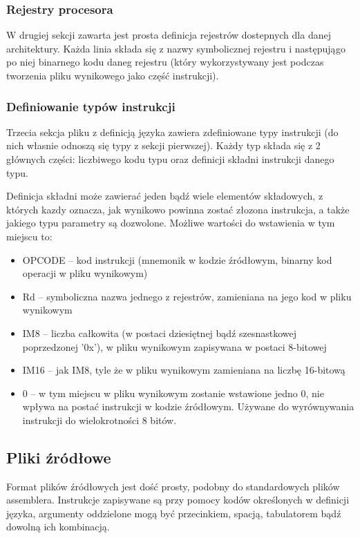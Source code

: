 \documentclass[a4paper,12pt]{report}
\begin{document}
\subsubsection{Rejestry procesora}

W drugiej sekcji zawarta jest prosta definicja rejestrów dostepnych dla danej architektury. Każda linia składa się z nazwy symbolicznej rejestru i następujągo po niej binarnego kodu daneg rejestru (który wykorzystywany jest podczas tworzenia pliku wynikowego jako część instrukcji).

\subsubsection{Definiowanie typów instrukcji}

Trzecia sekcja pliku z definicją języka zawiera zdefiniowane typy instrukcji (do nich własnie odnoszą się typy z sekcji pierwszej). Każdy typ składa się z 2 głównych części: liczbiwego kodu typu oraz definicji składni instrukcji danego typu.

Definicja składni może zawierać jeden bądź wiele elementów składowych, z których kazdy oznacza, jak wynikowo powinna zostać złozona instrukcja, a także jakiego typu parametry są dozwolone. Możliwe wartości do wstawienia w tym miejscu to:
\begin{itemize}
  \item OPCODE -- kod instrukcji (mnemonik w kodzie źródłowym, binarny kod operacji w pliku wynikowym)
  \item Rd -- symboliczna nazwa jednego z rejestrów, zamieniana na jego kod w pliku wynikowym
  \item IM8 -- liczba całkowita (w postaci dziesiętnej bądź szesnastkowej poprzedzonej '0x'), w pliku wynikowym zapisywana w postaci 8-bitowej
  \item IM16 -- jak IM8, tyle że w pliku wynikowym zamieniana na liczbę 16-bitową
  \item 0 -- w tym miejscu w pliku wynikowym zostanie wstawione jedno 0, nie wpływa na postać instrukcji w kodzie źródłowym. Używane do wyrównywania instrukcji do wielokrotności 8 bitów.
\end{itemize}

\subsection{Pliki źródłowe}

Format plików źródłowych jest dość prosty, podobny do standardowych plików assemblera. Instrukcje zapisywane są przy pomocy kodów określonych w definicji języka, argumenty oddzielone mogą być przecinkiem, spacją, tabulatorem bądź dowolną ich kombinacją. 
\end{document}
